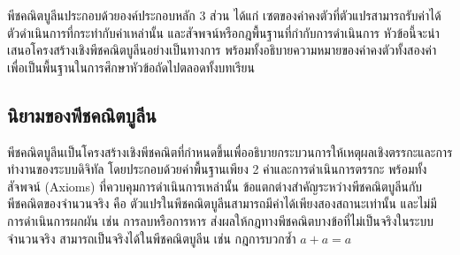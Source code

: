 พีชคณิตบูลีนประกอบด้วยองค์ประกอบหลัก 3 ส่วน ได้แก่ เซตของค่าคงตัวที่ตัวแปรสามารถรับค่าได้ ตัวดำเนินการที่กระทำกับค่าเหล่านั้น และสัจพจน์หรือกฎพื้นฐานที่กำกับการดำเนินการ หัวข้อนี้จะนำเสนอโครงสร้างเชิงพีชคณิตบูลีนอย่างเป็นทางการ พร้อมทั้งอธิบายความหมายของค่าคงตัวทั้งสองค่า เพื่อเป็นพื้นฐานในการศึกษาหัวข้อถัดไปตลอดทั้งบทเรียน~\parencite{mano2018digital}

\subsection{นิยามของพีชคณิตบูลีน}
พีชคณิตบูลีนเป็นโครงสร้างเชิงพีชคณิตที่กำหนดขึ้นเพื่ออธิบายกระบวนการให้เหตุผลเชิงตรรกะและการทำงานของระบบดิจิทัล โดยประกอบด้วยค่าพื้นฐานเพียง 2 ค่าและการดำเนินการตรรกะ พร้อมทั้งสัจพจน์ (Axioms) ที่ควบคุมการดำเนินการเหล่านั้น ข้อแตกต่างสำคัญระหว่างพีชคณิตบูลีนกับพีชคณิตของจำนวนจริง คือ ตัวแปรในพีชคณิตบูลีนสามารถมีค่าได้เพียงสองสถานะเท่านั้น และไม่มีการดำเนินการผกผัน เช่น การลบหรือการหาร ส่งผลให้กฎทางพีชคณิตบางข้อที่ไม่เป็นจริงในระบบจำนวนจริง สามารถเป็นจริงได้ในพีชคณิตบูลีน เช่น กฎการบวกซ้ำ $a + a = a$~\parencite{mano2018digital}

